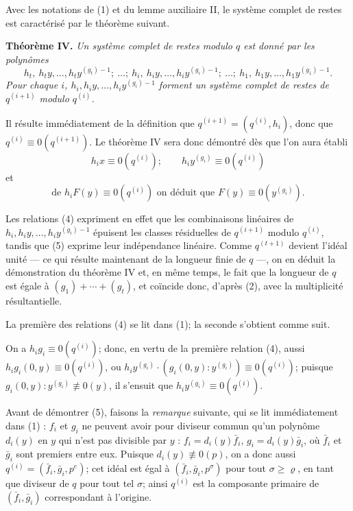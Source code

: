 Avec les notations de (1) et du lemme auxiliaire II, le système complet de restes est caractérisé par le théorème suivant.

\textbf{Théorème IV.} \emph{Un système complet de restes modulo $q$ est donné par les polynômes}
\[
h_t,\ h_ty,\ldots,h_ty^{(g_t)-1};\ \ldots;\ h_i,\ h_iy,\ldots,h_iy^{(g_i)-1};\ \ldots;\ h_1,\ h_1y,\ldots,h_1y^{(g_1)-1}.
\]
\emph{Pour chaque $i$, $h_i,h_iy,\ldots,h_iy^{(g_i)-1}$ forment un système complet de restes de $q^{(i+1)}$ modulo $q^{(i)}$.}

Il résulte immédiatement de la définition que $q^{(i+1)}=(q^{(i)},h_i)$, donc que $q^{(i)}\equiv0(q^{(i+1)})$. Le théorème IV sera donc démontré dès que l'on aura établi
\begin{equation}
\tag{4}
h_ix\equiv0(q^{(i)});\qquad h_iy^{(g_i)}\equiv0(q^{(i)})
\end{equation}
et
\begin{equation}
\tag{5}
\text{de }h_iF(y)\equiv0(q^{(i)})\text{ on déduit que }F(y)\equiv0(y^{(g_i)}).
\end{equation}

Les relations (4) expriment en effet que les combinaisons linéaires de $h_i,h_iy,\ldots,h_iy^{(g_i)-1}$ épuisent les classes résiduelles de $q^{(i+1)}$ modulo $q^{(i)}$, tandis que (5) exprime leur indépendance linéaire. Comme $q^{(t+1)}$ devient l'idéal unité --- ce qui résulte maintenant de la longueur finie de $q$ ---, on en déduit la démonstration du théorème IV et, en même temps, le fait que la longueur de $q$ est égale à $(g_1)+\cdots+(g_t)$, et coïncide donc, d'après (2), avec la multiplicité résultantielle.

La première des relations (4) se lit dans (1); la seconde s'obtient comme suit.

On a $h_ig_i\equiv0(q^{(i)})$; donc, en vertu de la première relation (4), aussi $h_ig_i(0,y)\equiv0(q^{(i)})$, ou
$h_iy^{(g_i)}\cdot(g_i(0,y):y^{(g_i)})\equiv0(q^{(i)})$; puisque $g_i(0,y):y^{(g_i)}\not\equiv0(y)$, il s'ensuit que $h_iy^{(g_i)}\equiv0(q^{(i)})$.

Avant de démontrer (5), faisons la \emph{remarque} suivante, qui se lit immédiatement dans (1) : $f_i$ et $g_i$ ne peuvent avoir pour diviseur commun qu'un polynôme $d_i(y)$ en $y$ qui n'est pas divisible par $y$ :
$f_i=d_i(y)\bar f_i$, $g_i=d_i(y)\bar g_i$, où $\bar f_i$ et $\bar g_i$ sont premiers entre eux. Puisque $d_i(y)\not\equiv0(p)$, on a donc aussi $q^{(i)}=(\bar f_i,\bar g_i,p^e)$; cet idéal est égal à $(\bar f_i,\bar g_i,p^\sigma)$ pour tout $\sigma\geq\varrho$, en tant que diviseur de $q$ pour tout tel $\sigma$; ainsi $q^{(i)}$ est la composante primaire de $(\bar f_i,\bar g_i)$ correspondant à l'origine.

